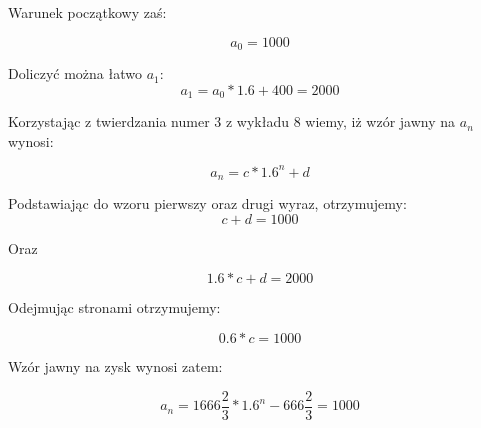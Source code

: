 \documentclass[paper=a4, fontsize=11pt]{scrartcl} %
\numberwithin{equation}{section} %
\numberwithin{figure}{section} %
\numberwithin{table}{section} %
\begin{document}
Warunek początkowy zaś:

\begin{equation}
  a_0 = 1000
\end{equation}

Doliczyć można łatwo \(a_1\):
\begin{equation}
  a_1 = a_0 * 1.6 + 400 = 2000
\end{equation}

Korzystając z twierdzania numer 3 z wykładu 8 wiemy, iż wzór jawny na \(a_n\) wynosi:

\begin{equation}
  a_n = c * 1.6^n + d
\end{equation}

Podstawiając do wzoru pierwszy oraz drugi wyraz, otrzymujemy:
\begin{equation}
  c + d = 1000
\end{equation}

Oraz

\begin{equation}
  1.6 * c + d = 2000
\end{equation}

Odejmując stronami otrzymujemy:

\begin{equation}
  0.6 * c = 1000
\end{equation}

Wzór jawny na zysk wynosi zatem:

\begin{equation}
  a_n = 1666 \frac{2}{3} * 1.6^n - 666\frac{2}{3} = 1000
\end{equation}
\end{document}
